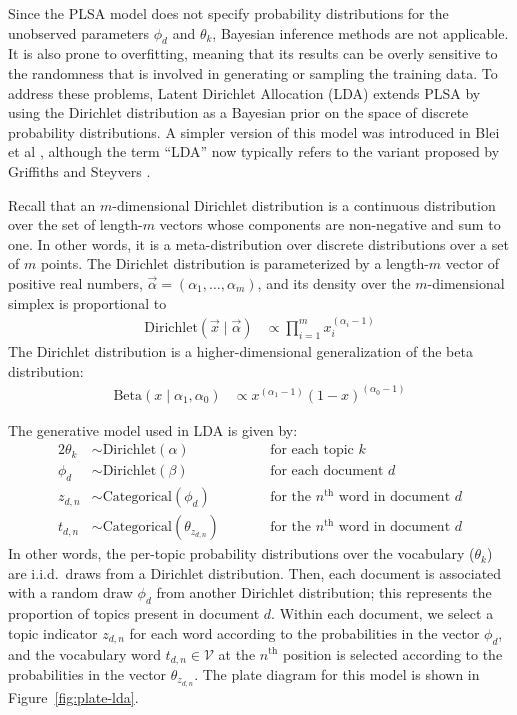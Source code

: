 \documentclass{article}
\newcommand{\nth}{^{\text{th}}}
\begin{document}
Since the PLSA model does not specify probability distributions for the unobserved parameters $\phi_d$ and $\theta_k$, Bayesian inference methods are not applicable.
It is also prone to overfitting, meaning that its results can be overly sensitive to the randomness that is involved in generating or sampling the training data.
To address these problems, Latent Dirichlet Allocation (LDA) extends PLSA by using the Dirichlet distribution as a Bayesian prior on the space of discrete probability distributions.
A simpler version of this model was introduced in Blei et al \cite{blei2003lda}, although the term ``LDA'' now typically refers to the variant proposed by Griffiths and Steyvers \cite{griffiths2004lda}.

Recall that an $m$-dimensional Dirichlet distribution is a continuous distribution over the set of length-$m$ vectors whose components are non-negative and sum to one.
In other words, it is a meta-distribution over discrete distributions over a set of $m$ points.
The Dirichlet distribution is parameterized by a length-$m$ vector of positive real numbers, $\vec \alpha = (\alpha_1, \ldots, \alpha_m)$, and its density over the $m$-dimensional simplex is proportional to
\begin{align}
\text{Dirichlet}(\vec x \mid \vec \alpha) &\propto \prod_{i=1}^m x_i^{(\alpha_i-1)}
\end{align}
The Dirichlet distribution is a higher-dimensional generalization of the beta distribution:
\begin{align}
\text{Beta}(x \mid \alpha_1, \alpha_0) &\propto x^{(\alpha_1-1)} (1-x)^{(\alpha_0-1)}
\end{align}

The generative model used in LDA is given by:
\begin{alignat}{2}
\theta_k &\sim \text{Dirichlet}(\alpha) &\qquad&\text{for each topic $k$} \\
\phi_d &\sim \text{Dirichlet}(\beta) &\qquad&\text{for each document $d$} \\
z_{d,n} &\sim \text{Categorical}(\phi_d) &\qquad&\text{for the $n\nth$ word in document $d$} \\
t_{d,n} &\sim \text{Categorical}(\theta_{z_{d,n}}) &\qquad&\text{for the $n\nth$ word in document $d$}
\end{alignat}
In other words, the per-topic probability distributions over the vocabulary ($\theta_k$) are i.i.d.\ draws from a Dirichlet distribution.
Then, each document is associated with a random draw $\phi_d$ from another Dirichlet distribution; this represents the proportion of topics present in document $d$.
Within each document, we select a topic indicator $z_{d,n}$ for each word according to the probabilities in the vector $\phi_d$, and the vocabulary word $t_{d,n} \in \mathcal V$ at the $n\nth$ position is selected according to the probabilities in the vector $\theta_{z_{d,n}}$.
The plate diagram for this model is shown in Figure~\ref{fig:plate-lda}.
\end{document}
